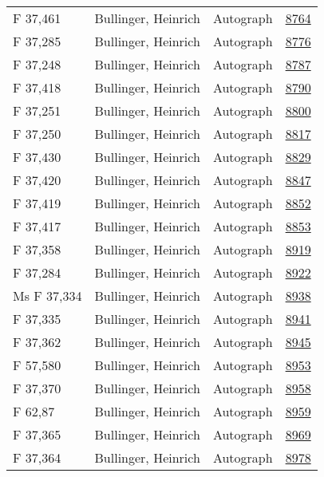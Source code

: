 \documentclass[10pt,a4paper,landscape]{report}
\begin{document}
\begin{longtable}{p{16cm}p{4cm}lr}
F 37,461	&	Bullinger, Heinrich	&	Autograph	&	\href{http://130.60.24.72/assignment/8764}{8764}\\
F 37,285	&	Bullinger, Heinrich	&	Autograph	&	\href{http://130.60.24.72/assignment/8776}{8776}\\
F 37,248	&	Bullinger, Heinrich	&	Autograph	&	\href{http://130.60.24.72/assignment/8787}{8787}\\
F 37,418	&	Bullinger, Heinrich	&	Autograph	&	\href{http://130.60.24.72/assignment/8790}{8790}\\
F 37,251	&	Bullinger, Heinrich	&	Autograph	&	\href{http://130.60.24.72/assignment/8800}{8800}\\
F 37,250	&	Bullinger, Heinrich	&	Autograph	&	\href{http://130.60.24.72/assignment/8817}{8817}\\
F 37,430	&	Bullinger, Heinrich	&	Autograph	&	\href{http://130.60.24.72/assignment/8829}{8829}\\
F 37,420	&	Bullinger, Heinrich	&	Autograph	&	\href{http://130.60.24.72/assignment/8847}{8847}\\
F 37,419	&	Bullinger, Heinrich	&	Autograph	&	\href{http://130.60.24.72/assignment/8852}{8852}\\
F 37,417	&	Bullinger, Heinrich	&	Autograph	&	\href{http://130.60.24.72/assignment/8853}{8853}\\
F 37,358	&	Bullinger, Heinrich	&	Autograph	&	\href{http://130.60.24.72/assignment/8919}{8919}\\
F 37,284	&	Bullinger, Heinrich	&	Autograph	&	\href{http://130.60.24.72/assignment/8922}{8922}\\
Ms F 37,334	&	Bullinger, Heinrich	&	Autograph	&	\href{http://130.60.24.72/assignment/8938}{8938}\\
F 37,335	&	Bullinger, Heinrich	&	Autograph	&	\href{http://130.60.24.72/assignment/8941}{8941}\\
F 37,362	&	Bullinger, Heinrich	&	Autograph	&	\href{http://130.60.24.72/assignment/8945}{8945}\\
F 57,580	&	Bullinger, Heinrich	&	Autograph	&	\href{http://130.60.24.72/assignment/8953}{8953}\\
F 37,370	&	Bullinger, Heinrich	&	Autograph	&	\href{http://130.60.24.72/assignment/8958}{8958}\\
F 62,87	&	Bullinger, Heinrich	&	Autograph	&	\href{http://130.60.24.72/assignment/8959}{8959}\\
F 37,365	&	Bullinger, Heinrich	&	Autograph	&	\href{http://130.60.24.72/assignment/8969}{8969}\\
F 37,364	&	Bullinger, Heinrich	&	Autograph	&	\href{http://130.60.24.72/assignment/8978}{8978}\\

\end{longtable}
\end{document}
